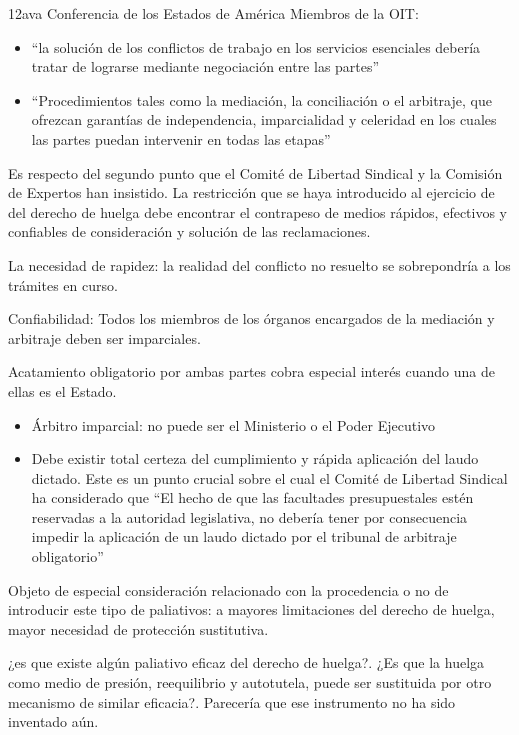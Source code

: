 \documentclass[spanish,12pt,a4paper,titlepage]{report}
\begin{document}
12ava Conferencia de los Estados de América Miembros de la OIT:

\begin{itemize}
\item ``la solución de los conflictos de trabajo en los servicios esenciales debería tratar de lograrse mediante negociación entre las partes''
\item ``Procedimientos tales como la mediación, la conciliación o el arbitraje, que ofrezcan garantías de independencia, imparcialidad y celeridad en los cuales las partes puedan intervenir en todas las etapas''
\end{itemize}

Es respecto del segundo punto que el Comité de Libertad Sindical y la Comisión de Expertos han insistido. La restricción que se haya introducido al ejercicio de del derecho de huelga debe encontrar el contrapeso de medios rápidos, efectivos y confiables de consideración y solución de las reclamaciones. 

La necesidad de rapidez: la realidad del conflicto no resuelto se sobrepondría a los trámites en curso.

Confiabilidad: Todos los miembros de los órganos encargados de la mediación y arbitraje deben ser imparciales.

Acatamiento obligatorio por ambas partes cobra especial interés cuando una de ellas es el Estado.
\begin{itemize}
\item Árbitro imparcial: no puede ser el Ministerio o el Poder Ejecutivo
\item Debe existir total certeza del cumplimiento y rápida aplicación del laudo dictado. Este es un punto crucial sobre el cual el Comité de Libertad Sindical ha considerado que ``El hecho de que las facultades presupuestales estén reservadas a la autoridad legislativa, no debería tener por consecuencia impedir la aplicación de un laudo dictado por el tribunal de arbitraje obligatorio''
\end{itemize}


Objeto de especial consideración relacionado con la procedencia o no de introducir este tipo de paliativos: a mayores limitaciones del derecho de huelga, mayor necesidad de protección sustitutiva. 

¿es que existe algún paliativo eficaz del derecho de huelga?.  ¿Es 
que la huelga como medio de presión, reequilibrio y autotutela, puede ser 
sustituida por otro mecanismo de similar eficacia?.  Parecería que ese 
instrumento no ha sido inventado aún.
\end{document}

